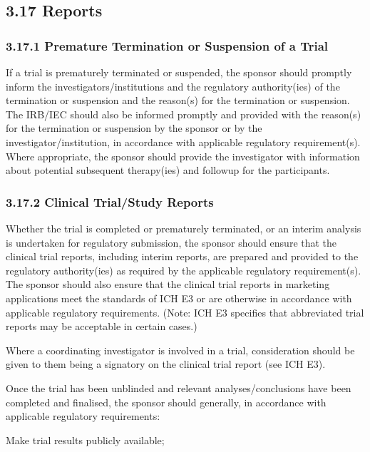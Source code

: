\documentclass[11pt]{article}
\begin{document}
\subsection{3.17 Reports}

\subsubsection{3.17.1 Premature Termination or Suspension of a Trial}

If a trial is prematurely terminated or suspended, the sponsor should promptly inform the investigators/institutions and the regulatory authority(ies) of the termination or suspension and the reason(s) for the termination or suspension. The IRB/IEC should also be informed promptly and provided with the reason(s) for the termination or suspension by the sponsor or by the investigator/institution, in accordance with applicable regulatory requirement(s). Where appropriate, the sponsor should provide the investigator with information about potential subsequent therapy(ies) and followup for the participants.


\subsubsection{3.17.2 Clinical Trial/Study Reports}

\begin{description}[leftmargin=2.5cm,style=sameline]

\item[(a)] Whether the trial is completed or prematurely terminated, or an interim analysis is undertaken for regulatory submission, the sponsor should ensure that the clinical trial reports, including interim reports, are prepared and provided to the regulatory authority(ies) as required by the applicable regulatory requirement(s). The sponsor should also ensure that the clinical trial reports in marketing applications meet the standards of ICH E3 or are otherwise in accordance with applicable regulatory requirements. (Note: ICH E3 specifies that abbreviated trial reports may be acceptable in certain cases.)

\item[(b)] Where a coordinating investigator is involved in a trial, consideration should be given to them being a signatory on the clinical trial report (see ICH E3).

\item[(c)] Once the trial has been unblinded and relevant analyses/conclusions have been completed and finalised, the sponsor should generally, in accordance with applicable regulatory requirements:

\item[(i)] Make trial results publicly available;

\end{description}
\end{document}
